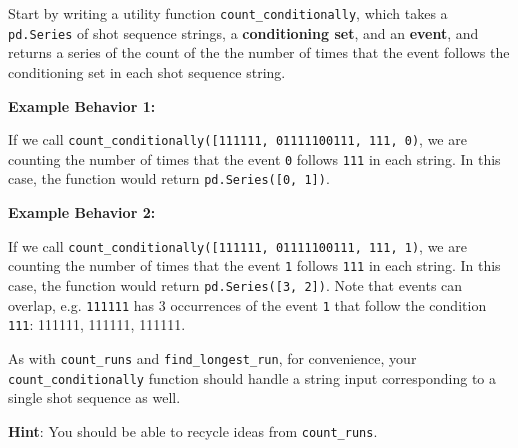 \documentclass[11pt]{article}
\begin{document}
Start by writing a utility function \texttt{count\_conditionally}, which
takes a \texttt{pd.Series} of shot sequence strings, a
\textbf{conditioning set}, and an \textbf{event}, and returns a series
of the count of the the number of times that the event follows the
conditioning set in each shot sequence string.

\textbf{Example Behavior 1:}

If we call
\texttt{count\_conditionally({[}\textquotesingle{}111111\textquotesingle{},\ \textquotesingle{}01111100111\textquotesingle{}{]},\ \textquotesingle{}111\textquotesingle{},\ \textquotesingle{}0\textquotesingle{})},
we are counting the number of times that the event \texttt{0} follows
\texttt{111} in each string. In this case, the function would return
\texttt{pd.Series({[}0,\ 1{]})}.

\textbf{Example Behavior 2:}

If we call
\texttt{count\_conditionally({[}\textquotesingle{}111111\textquotesingle{},\ \textquotesingle{}01111100111\textquotesingle{}{]},\ \textquotesingle{}111\textquotesingle{},\ \textquotesingle{}1\textquotesingle{})},
we are counting the number of times that the event \texttt{1} follows
\texttt{111} in each string. In this case, the function would return
\texttt{pd.Series({[}3,\ 2{]})}. Note that events can overlap, e.g.
\texttt{111111} has 3 occurrences of the event \texttt{1} that follow
the condition \texttt{111}: {111}{1}11, 1{111}{1}1, 11{111}{1}.

As with \texttt{count\_runs} and \texttt{find\_longest\_run}, for
convenience, your \texttt{count\_conditionally} function should handle a
string input corresponding to a single shot sequence as well.

\textbf{Hint}: You should be able to recycle ideas from
\texttt{count\_runs}.
\end{document}
